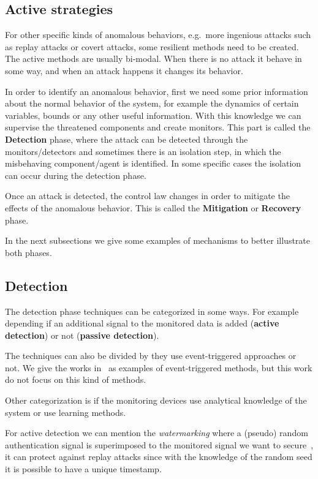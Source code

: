 \documentclass[../main.tex]{subfiles}
\begin{document}
\subsection{Active strategies}\label{sec:protecting_against_attacks}

For other specific kinds of anomalous behaviors, e.g.\ more ingenious attacks such as replay attacks or covert attacks, some resilient methods need to be created.
The active methods are usually bi-modal.
When there is no attack it behave in some way, and when an attack happens it changes its behavior.

In order to identify an anomalous behavior, first we need some prior information about the normal behavior of the system, for example the dynamics of certain variables, bounds or any other useful information.
With this knowledge we can supervise the threatened components and create monitors.
This part is called the \textbf{Detection} phase, where the attack can be detected through the monitors/detectors and sometimes there is an isolation step, in which the misbehaving component/agent is identified.
In some specific cases the isolation can occur during the detection phase.

Once an attack is detected, the control law changes in order to mitigate the effects of the anomalous behavior.
This is called the \textbf{Mitigation} or \textbf{Recovery} phase.

In the next subsections we give some examples of mechanisms to better illustrate both phases.

\subsection{Detection}

The detection phase techniques can be categorized in some ways.
For example depending if an additional signal to the monitored data is added (\textbf{active detection}) or not (\textbf{passive detection}).

The techniques can also be divided by they use event-triggered approaches or not.
We give the works in~\cite{SunYang2019,HuEtAl2021,SunEtAl2022} as examples of event-triggered methods, but this work do not focus on this kind of methods.

Other categorization is if the monitoring devices use analytical knowledge of the system or use learning methods.

For active detection we can mention the \emph{watermarking} where a (pseudo) random authentication signal is superimposed to the monitored signal we want to secure~\cite{MoSinopoli2009,MoEtAl2015,SatchidanandanKumar2017,KshetriVoas2017,LuciaEtAl2021}, it can protect against replay attacks since with the knowledge of the random seed it is possible to have a unique timestamp.
\end{document}
